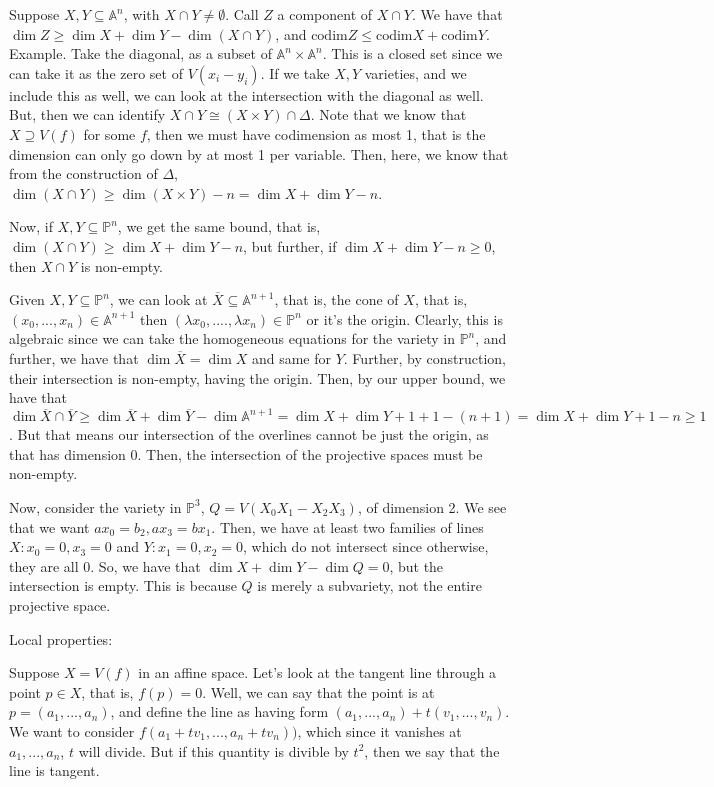 \documentclass[10pt]{article}
\newcommand{\codim}{\text{codim}}
\begin{document}
Suppose $X,Y \subseteq \mathbb{A}^n$, with $X \cap Y \not = \emptyset$. Call $Z$ a component of $X \cap Y$. We have that $\dim Z \geq \dim X + \dim Y - \dim (X \cap Y)$, and $\codim Z \leq \codim X + \codim Y$. Example. Take the diagonal, as a subset of $\mathbb{A}^n \times \mathbb{A}^n$. This is a closed set since we can take it as the zero set of $V(x_i - y_i)$. If we take $X,Y$ varieties, and we include this as well, we can look at the intersection with the diagonal as well. But, then we can identify $X \cap Y \cong (X \times Y) \cap \Delta$. Note that we know that $X \supseteq V(f)$ for some $f$, then we must have codimension as most 1, that is the dimension can only go down by at most 1 per variable. Then, here, we know that from the construction of $\Delta$, $\dim (X \cap Y) \geq \dim(X \times Y) - n = \dim X + \dim Y - n$.

Now, if $X,Y \subseteq \mathbb{P}^n$, we get the same bound, that is, $\dim (X \cap Y) \geq \dim X + \dim Y - n$, but further, if $\dim X + \dim Y - n \geq 0$, then $X \cap Y$ is non-empty.

Given $X,Y \subseteq \mathbb{P}^n$, we can look at $\overline{X} \subseteq \mathbb{A}^{n+1}$, that is, the cone of $X$, that is, $(x_0,...,x_n) \in \mathbb{A}^{n+1}$ then $(\lambda x_0,....,\lambda x_n) \in \mathbb{P}^n$ or it’s the origin. Clearly, this is algebraic since we can take the homogeneous equations for the variety in $\mathbb{P}^n$, and further, we have that $\dim \overline{X} = \dim X$ and same for $Y$. Further, by construction, their intersection is non-empty, having the origin. Then, by our upper bound, we have that $\dim \overline{X} \cap \overline{Y} \geq \dim \overline{X} + \dim \overline{Y} - \dim \mathbb{A}^{n+1} = \dim X + \dim Y + 1 + 1 - (n+1) = \dim X + \dim Y + 1 - n \geq 1$. But that means our intersection of the overlines cannot be just the origin, as that has dimension 0. Then, the intersection of the projective spaces must be non-empty.

Now, consider the variety in $\mathbb{P}^3$, $Q = V(X_0X_1 - X_2 X_3)$, of dimension 2. We see that we want $ax_0 = b_2, ax_3 = bx_1$. Then, we have at least two families of lines $X: x_0 = 0, x_3 = 0$ and $Y: x_1 = 0, x_2 = 0$, which do not intersect since otherwise, they are all $0$. So, we have that $\dim X + \dim Y - \dim Q = 0$, but the intersection is empty. This is because $Q$ is merely a subvariety, not the entire projective space.

Local properties: 

Suppose $ X = V(f)$ in an affine space. Let’s look at the tangent line through a point $p \in X$, that is, $f(p) = 0$. Well, we can say that the point is at $p = (a_1,...,a_n)$, and define the line as having form $(a_1,...,a_n) + t(v_1,...,v_n)$. We want to consider $f(a_1 + tv_1,...,a_n + t v_n))$, which since it vanishes at $a_1,...,a_n$, $t$ will divide. But if this quantity is divible by $t^2$, then we say that the line is tangent. 
\end{document}
